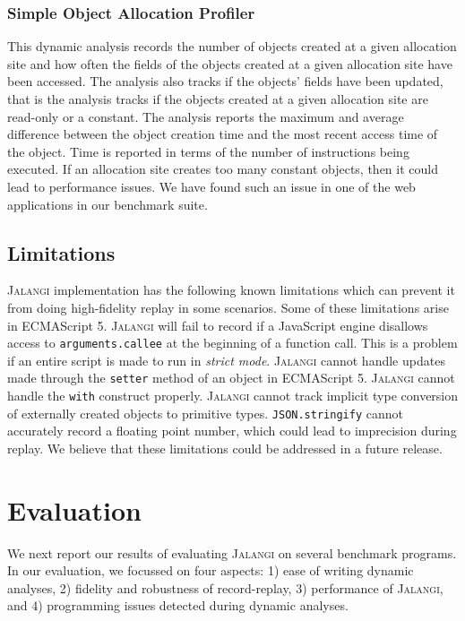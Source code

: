 \documentclass{sig-alternate}
\def\jalangi{\textsc{Jalangi}}
\begin{document}
\subsubsection*{Simple Object Allocation Profiler}
\label{sec:simple-object-alloc}

This dynamic analysis records the number of objects created at a given
allocation site and how often the fields of the objects created at a
given allocation site have been accessed.  The analysis also tracks if
the objects' fields have been updated, that is the analysis tracks if
the objects created at a given allocation site are read-only or a
constant.  The analysis reports the maximum and average difference
between the object creation time and the most recent access time of
the object.  Time is reported in terms of the number of instructions
being executed.  If an allocation site creates too many constant
objects, then it could lead to performance issues.  We have found such
an issue in one of the web applications in our benchmark suite.

\subsection*{Limitations}
\label{sec:limitations}

\jalangi{} implementation has the following known limitations which
can prevent it from doing high-fidelity replay in some scenarios.
Some of these limitations arise in ECMAScript 5.  \jalangi{} will fail
to record if a JavaScript engine disallows access to
\texttt{arguments.callee} at the beginning of a function call.  This
is a problem if an entire script is made to run in \emph{strict mode}.
\jalangi{} cannot handle updates made through the \texttt{setter}
method of an object in ECMAScript 5.  \jalangi{} cannot handle the
\texttt{with} construct properly.  \jalangi{} cannot track implicit
type conversion of externally created objects to primitive types.
\texttt{JSON.stringify} cannot accurately record a floating point
number, which could lead to imprecision during replay.  We believe
that these limitations could be addressed in a future release.


\section{Evaluation}
\label{sec:evaluation}

We next report our results of evaluating \jalangi{} on several
benchmark programs.  In our evaluation, we focussed on four aspects:
1) ease of writing dynamic analyses, 2) fidelity and robustness of
record-replay, 3) performance of \jalangi{}, and 4) programming issues
detected during dynamic analyses.
\end{document}
